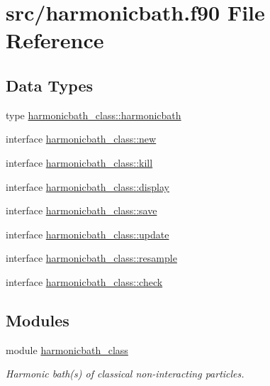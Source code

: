 \hypertarget{harmonicbath_8f90}{}\section{src/harmonicbath.f90 File Reference}
\label{harmonicbath_8f90}
\subsection*{Data Types}
\begin{DoxyCompactItemize}
\item 
type \hyperlink{structharmonicbath__class_1_1harmonicbath}{harmonicbath\+\_\+class\+::harmonicbath}
\item 
interface \hyperlink{interfaceharmonicbath__class_1_1new}{harmonicbath\+\_\+class\+::new}
\item 
interface \hyperlink{interfaceharmonicbath__class_1_1kill}{harmonicbath\+\_\+class\+::kill}
\item 
interface \hyperlink{interfaceharmonicbath__class_1_1display}{harmonicbath\+\_\+class\+::display}
\item 
interface \hyperlink{interfaceharmonicbath__class_1_1save}{harmonicbath\+\_\+class\+::save}
\item 
interface \hyperlink{interfaceharmonicbath__class_1_1update}{harmonicbath\+\_\+class\+::update}
\item 
interface \hyperlink{interfaceharmonicbath__class_1_1resample}{harmonicbath\+\_\+class\+::resample}
\item 
interface \hyperlink{interfaceharmonicbath__class_1_1check}{harmonicbath\+\_\+class\+::check}
\end{DoxyCompactItemize}
\subsection*{Modules}
\begin{DoxyCompactItemize}
\item 
module \hyperlink{namespaceharmonicbath__class}{harmonicbath\+\_\+class}
\begin{DoxyCompactList}\small\item\em Harmonic bath(s) of classical non-\/interacting particles. \end{DoxyCompactList}\end{DoxyCompactItemize}
